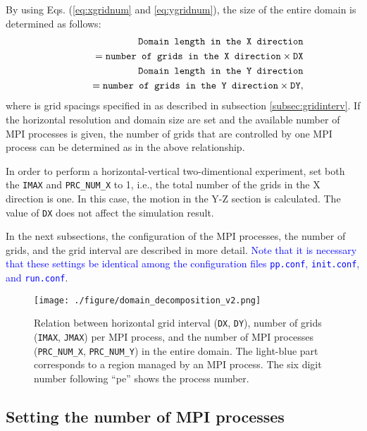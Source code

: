 By using Eqs. (\ref{eq:xgridnum} and \ref{eq:ygridnum}),  the size of the entire domain is determined as follows:
\begin{eqnarray}
&& \verb|Domain length in the X direction| \nonumber\\
&&    \qquad = \verb|number of grids in the X direction| \times \verb|DX|\\
&& \verb|Domain length in the Y direction| \nonumber\\
&&    \qquad = \verb|number of grids in the Y direction| \times \verb|DY|,
\end{eqnarray}
where  is grid spacings specified  in  as described in subsection \ref{subsec:gridinterv}.
If the horizontal resolution and domain size are set and the available number of MPI processes is given, the number of grids that are controlled by one MPI process can be determined as in the above relationship.

In order to perform a horizontal-vertical two-dimentional experiment, set both the \texttt{IMAX} and \texttt{PRC\_NUM\_X} to 1, i.e., the total number of the grids in the X direction is one.
In this case, the motion in the Y-Z section is calculated.
The value of \texttt{DX} does not affect the simulation result.

In the next subsections, the configuration of the MPI processes, the number of grids, and the grid interval are described in more detail.  \textcolor{blue}{Note that it is necessary that these settings  be identical among the configuration files \texttt{pp.conf},  \texttt{init.conf}, and \texttt{run.conf}}.

\begin{figure}[h]
\begin{center}
  \texttt{[image: ./figure/domain\_decomposition\_v2.png]}\\
  \caption{Relation between horizontal grid interval (\texttt{DX}, \texttt{DY}),
   number of grids (\texttt{IMAX}, \texttt{JMAX}) per MPI process,
   and the number of MPI processes (\texttt{PRC\_NUM\_X}, \texttt{PRC\_NUM\_Y}) in the entire domain.
   The light-blue part corresponds to a region managed by an MPI process.
   The six digit number following ``pe'' shows the process number.}
  \label{fig:domain}
\end{center}
\end{figure}

\subsection{Setting the number of MPI processes} \label{subsec:relation_dom_reso2}


